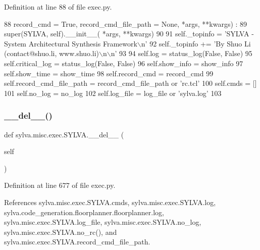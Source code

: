 Definition at line 88 of file exec.\+py.


\begin{DoxyCode}
88     record\_cmd = \textcolor{keyword}{True}, record\_cmd\_file\_path = \textcolor{keywordtype}{None}, *args, **kwargs) :
89     super(SYLVA, self).\_\_init\_\_( *args, **kwargs)
90 
91     self.\_topinfo = \textcolor{stringliteral}{'SYLVA - System Architectural Synthesis Framework\(\backslash\)n'}
92     self.\_topinfo += \textcolor{stringliteral}{'By Shuo Li (contact@shuo.li, www.shuo.li)\(\backslash\)n\(\backslash\)n'}
93 
94     self.log = status\_log(\textcolor{keyword}{False}, \textcolor{keyword}{False})
95     self.critical\_log = status\_log(\textcolor{keyword}{False}, \textcolor{keyword}{False})
96     self.show\_info = show\_info
97     self.show\_time = show\_time
98     self.record\_cmd = record\_cmd
99     self.record\_cmd\_file\_path = record\_cmd\_file\_path \textcolor{keywordflow}{or} \textcolor{stringliteral}{'rc.tcl'}
100     self.cmds = []
101     self.no\_log = no\_log
102     self.log\_file = log\_file \textcolor{keywordflow}{or} \textcolor{stringliteral}{'sylva.log'}
103 
\end{DoxyCode}
\mbox{\label{classsylva_1_1misc_1_1exec_1_1_s_y_l_v_a_af65fde8b73d4a20bb2fba9d6d31d5e51}} 
\subsubsection{\texorpdfstring{\+\_\+\+\_\+del\+\_\+\+\_\+()}{\_\_del\_\_()}}
{\footnotesize\ttfamily def sylva.\+misc.\+exec.\+S\+Y\+L\+V\+A.\+\_\+\+\_\+del\+\_\+\+\_\+ (\begin{DoxyParamCaption}\item[{}]{self }\end{DoxyParamCaption})}



Definition at line 677 of file exec.\+py.



References sylva.\+misc.\+exec.\+S\+Y\+L\+V\+A.\+cmds, sylva.\+misc.\+exec.\+S\+Y\+L\+V\+A.\+log, sylva.\+code\+\_\+generation.\+floorplanner.\+floorplanner.\+log, sylva.\+misc.\+exec.\+S\+Y\+L\+V\+A.\+log\+\_\+file, sylva.\+misc.\+exec.\+S\+Y\+L\+V\+A.\+no\+\_\+log, sylva.\+misc.\+exec.\+S\+Y\+L\+V\+A.\+no\+\_\+rc(), and sylva.\+misc.\+exec.\+S\+Y\+L\+V\+A.\+record\+\_\+cmd\+\_\+file\+\_\+path.


